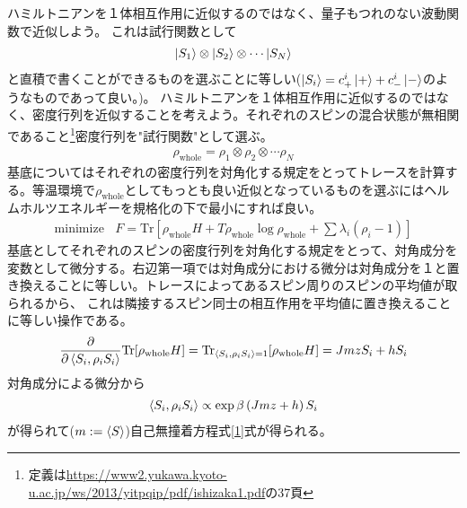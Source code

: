 \documentclass[autodetect-engine,dvipdfmx-if-dvi,ja=standard]{bxjsarticle}
\theoremstyle{break}
\begin{document}
                    ハミルトニアンを１体相互作用に近似するのではなく、量子もつれのない波動関数で近似しよう。
                    これは試行関数として
                    \begin{align}
                        \ket{S_1}\otimes \ket{S_2} \otimes \cdots \ket{S_N}
                    \end{align}
                    と直積で書くことができるものを選ぶことに等しい($\ket{S_i}=c^i _+\ket{+}+c^i _-\ket{-}$のようなものであって良い。)。
                \fi
                ハミルトニアンを１体相互作用に近似するのではなく、密度行列を近似することを考えよう。それぞれのスピンの混合状態が無相関であること\footnote{定義は\url{https://www2.yukawa.kyoto-u.ac.jp/ws/2013/yitpqip/pdf/ishizaka1.pdf}の37頁}密度行列を"試行関数"として選ぶ。
                \begin{align}
                    \rho_{\mathrm{whole}}=\rho_1 \otimes \rho_2 \otimes \cdots \rho_N
                \end{align}
                基底についてはそれぞれの密度行列を対角化する規定をとってトレースを計算する。等温環境で$\rho_{\mathrm{whole}}$としてもっとも良い近似となっているものを選ぶにはヘルムホルツエネルギーを規格化の下で最小にすれば良い。
                \begin{align}
                    \mathrm{minimize}~~~~F=\mathrm{Tr}[\rho_{\mathrm{whole}} H +T\rho_{\mathrm{whole}}\log \rho_{\mathrm{whole}}+\sum \lambda_i (\rho_{i}-1)]
                \end{align}
                基底としてそれぞれのスピンの密度行列を対角化する規定をとって、対角成分を変数として微分する。右辺第一項では対角成分における微分は対角成分を１と置き換えることに等しい。トレースによってあるスピン周りのスピンの平均値が取られるから、
                これは隣接するスピン同士の相互作用を平均値に置き換えることに等しい操作である。
                \begin{align}
                    \frac{\partial}{\partial \braket{S_i,\rho_i S_i}}\mathrm{Tr}[\rho_{\mathrm{whole}} H]=\mathrm{Tr}_{\braket{S_i,\rho_i S_i}=1}[\rho_{\mathrm{whole}} H]=JmzS_i +hS_i
                \end{align}
                対角成分による微分から
                \begin{align}
                    \braket{S_i,\rho_i S_i}\propto \exp\beta \left(Jmz+h\right)S_i
                \end{align}
                が得られて($m:=\braket{S}$)自己無撞着方程式\eqref{1}式が得られる。
\end{document}

